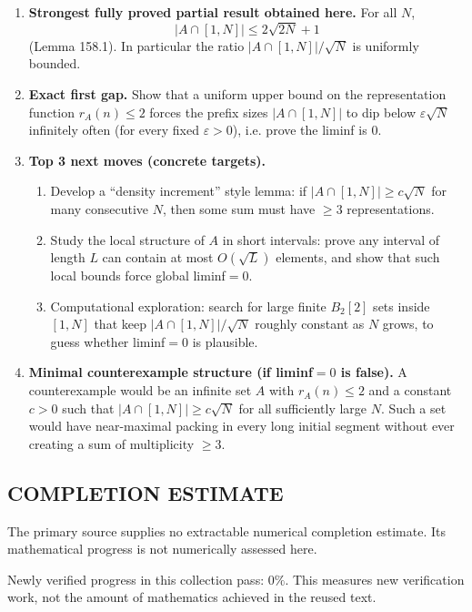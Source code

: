 \begin{enumerate}
\item[(i)] \textbf{Strongest fully proved partial result obtained here.}
For all $N$,
\[
|A\cap[1,N]|\le 2\sqrt{2N}+1
\]
(Lemma 158.1). In particular the ratio $|A\cap[1,N]|/\sqrt N$ is uniformly bounded.

\item[(ii)] \textbf{Exact first gap.}
Show that a uniform upper bound on the representation function $r_A(n)\le 2$ forces the prefix sizes $|A\cap[1,N]|$ to dip below $\varepsilon\sqrt N$ infinitely often (for every fixed $\varepsilon>0$), i.e. prove the liminf is $0$.

\item[(iii)] \textbf{Top 3 next moves (concrete targets).}
\begin{enumerate}
\item Develop a ``density increment'' style lemma: if $|A\cap[1,N]|\ge c\sqrt N$ for many consecutive $N$, then some sum must have $\ge 3$ representations.
\item Study the local structure of $A$ in short intervals: prove any interval of length $L$ can contain at most $O(\sqrt L)$ elements, and show that such local bounds force global liminf$=0$.
\item Computational exploration: search for large finite $B_2[2]$ sets inside $[1,N]$ that keep $|A\cap[1,N]|/\sqrt N$ roughly constant as $N$ grows, to guess whether liminf$=0$ is plausible.
\end{enumerate}

\item[(iv)] \textbf{Minimal counterexample structure (if liminf$=0$ is false).}
A counterexample would be an infinite set $A$ with $r_A(n)\le 2$ and a constant $c>0$ such that $|A\cap[1,N]|\ge c\sqrt N$ for all sufficiently large $N$. Such a set would have near-maximal packing in every long initial segment without ever creating a sum of multiplicity $\ge 3$.
\end{enumerate}




\subsection*{COMPLETION ESTIMATE}
The primary source supplies no extractable numerical completion estimate. Its mathematical progress is not numerically assessed here.

Newly verified progress in this collection pass: $0\%$. This measures new verification work, not the amount of mathematics achieved in the reused text.
